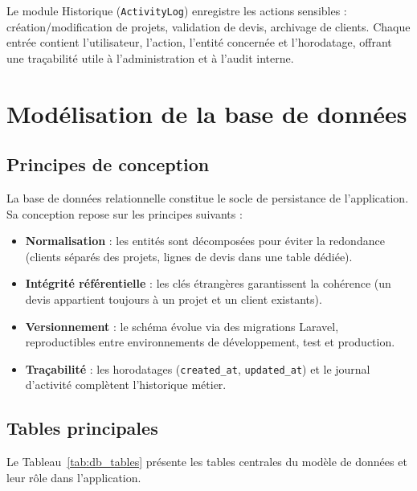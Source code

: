 \medskip

Le module Historique (\texttt{ActivityLog}) enregistre les actions sensibles :
création/modification de projets, validation de devis, archivage de clients.
Chaque entrée contient l'utilisateur, l'action, l'entité concernée et l'horodatage,
offrant une traçabilité utile à l'administration et à l'audit interne.

\section{Modélisation de la base de données}

\subsection{Principes de conception}

La base de données relationnelle constitue le socle de persistance de l'application.
Sa conception repose sur les principes suivants :

\begin{itemize}
  \item \textbf{Normalisation} : les entités sont décomposées pour éviter la
  redondance (clients séparés des projets, lignes de devis dans une table dédiée).
  \item \textbf{Intégrité référentielle} : les clés étrangères garantissent la
  cohérence (un devis appartient toujours à un projet et un client existants).
  \item \textbf{Versionnement} : le schéma évolue via des migrations Laravel,
  reproductibles entre environnements de développement, test et production.
  \item \textbf{Traçabilité} : les horodatages (\texttt{created\_at},
  \texttt{updated\_at}) et le journal d'activité complètent l'historique métier.
\end{itemize}

\subsection{Tables principales}

Le Tableau~\ref{tab:db_tables} présente les tables centrales du modèle de données
et leur rôle dans l'application.

